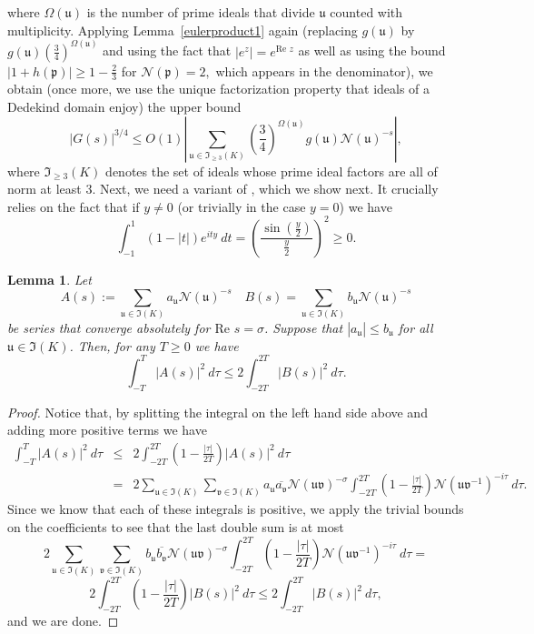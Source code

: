 \documentclass[11pt]{amsart}
\newtheorem{lemma}{Lemma}[section]
\theoremstyle{definition}
\newcommand{\NN}{{\mathcal N}}
\newcommand{\mf}{\mathfrak}
\begin{document}
where $\Omega(\mf u)$ is the number of prime ideals that divide $\mf u$ counted with multiplicity. Applying Lemma~\ref{eulerproduct1} again (replacing $g(\mf u)$ by $g(\mf u)\left(\frac{3}{4}\right)^{\Omega(\mf u)}$ and using the fact that $|e^{z}|=e^{\text{Re }z}$ as well as using the bound $|1+h(\mf p)| \geq 1-\frac{2}{3}$ for $\NN(\mf p)=2,$ which appears in the denominator), we obtain (once more, we use the unique factorization property that ideals of a Dedekind domain enjoy) the upper bound
\begin{equation}\label{wgwgdg}
    |G(s)|^{3/4} \leq O(1)\left| \sum_{\mf u \in \mf I_{\geq 3}(K)} \left(\frac{3}{4}\right)^{\Omega(\mf u)} g(\mf u)\NN(\mf u )^{-s}\right|,
\end{equation}
where $\mf I_{\geq 3}(K)$ denotes the set of ideals whose prime ideal factors are all of norm at least 3.
Next, we need a variant of \cite[Lemma~6.5]{E79book}, which we show next. It crucially relies on the fact that if $y \neq 0$ (or trivially in the case $y=0$) we have
\[
\int_{-1}^1 (1-|t|)e^{ity} \ dt = \left(\frac{\sin \left(\frac{y}{2}\right)}{\frac{y}{2}}\right)^2 \geq 0.
\]
\begin{lemma}\label{montgomeryadapted}
Let
\[
A(s):=\sum_{\mf u \in \mf I(K)} a_{\mf u} \NN(\mf u)^{-s} \quad B(s)= \sum_{\mf u \in \mf I(K)} b_{\mf u} \NN(\mf u)^{-s}
\]
be series that converge absolutely for $\text{Re } s=\sigma$. Suppose that $|a_{\mf u}|\leq b_{\mf u}$ for all $\mf u \in \mf I(K)$. Then, for any $T \geq 0$ we have
\[
\int_{-T}^T |A(s)|^2 \ d\tau \leq 2 \int_{-2T}^{2T} |B(s)|^2 \ d\tau.
\]
\end{lemma}
\begin{proof}
Notice that, by splitting the integral on the left hand side above and adding more positive terms we have
\begin{eqnarray*}
    \int_{-T}^T |A(s)|^2 \ d\tau & \leq & 2 \int_{-2T}^{2T} \left(1-\frac{|\tau|}{2T}\right) |A(s)|^2 \ d\tau \\ & = & 2\sum_{\mf u \in \mf I(K)}\sum_{\mf v \in \mf I(K)} a_{\mf u} \overline{a_{\mf v}} \NN(\mf u \mf v)^{-\sigma} \int_{-2T}^{2T} \left(1-\frac{|\tau|}{2T}\right) \NN(\mf u\mf v^{-1})^{-i\tau} \ d\tau.
\end{eqnarray*}
Since we know that each of these integrals is positive, we apply the trivial bounds on the coefficients to see that the last double sum is at most
\[
2\sum_{\mf u \in \mf I(K)}\sum_{\mf v \in \mf I(K)} b_{\mf u} \overline{b_{\mf v}} \NN(\mf u \mf v)^{-\sigma}  \int_{-2T}^{2T} \left(1-\frac{|\tau|}{2T}\right) \NN(\mf u\mf v^{-1})^{-i\tau} \ d\tau = \]
\[
2\int_{-2T}^{2T} \left(1-\frac{|\tau|}{2T}\right) |B(s)|^2 \ d\tau \leq 2 \int_{-2T}^{2T} |B(s)|^2 \ d\tau,
\]
and we are done.
\end{proof}
\end{document}
